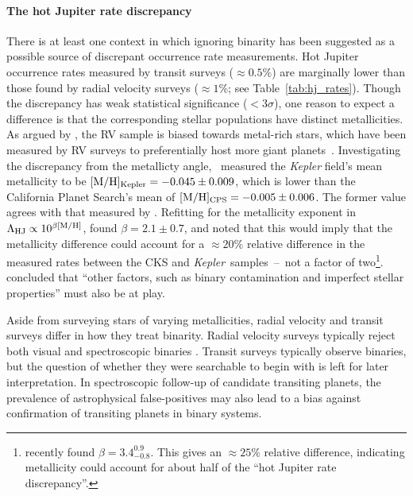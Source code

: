 \documentclass[12pt,modern]{aastex61}
\begin{document}
\paragraph{The hot Jupiter rate discrepancy}
There is at least one context in which ignoring binarity has been suggested as 
a possible source of discrepant occurrence rate measurements.
Hot Jupiter occurrence rates measured by transit surveys ($\approx 0.5\%$) are 
marginally lower than those found by radial velocity surveys ($\approx 1\%$; 
see Table~\ref{tab:hj_rates}).
Though the discrepancy has weak statistical significance ($<3\sigma$),
one reason to expect a difference is that the corresponding stellar 
populations have distinct metallicities.
As argued by \citet{gould_frequency_2006}, the RV sample is biased towards 
metal-rich stars, which have been measured by RV surveys to preferentially 
host more giant 
planets~\citep{santos_spectroscopic_2004,fischer_planet-metallicity_2005}.
Investigating the discrepancy from the metallicty 
angle,~\citet{guo_metallicity_2017} measured the
{\it Kepler} field's mean metallicity to be $[{\rm M/H}]_{\rm Kepler}= 
-0.045\pm0.009$, which is lower than the California Planet Search's mean of 
$[{\rm M/H}]_{\rm CPS}= -0.005\pm0.006$.
The former value agrees with that measured by \citet{dong_metallicities_2014}.
Refitting for the metallicity exponent in $\Lambda_{\rm HJ} \propto 10^{\beta 
[{\rm M/H}] }$, \citeauthor{guo_metallicity_2017}\! found $\beta = 2.1\pm 
0.7$, and noted that this would imply that the metallicity difference could 
account for a $\approx 20\%$ relative difference in the measured rates between 
the CKS and {\it Kepler}\ samples~--~not a factor of two\footnote{
\citet{petigura_CKS_2017} recently found $\beta = 3.4^{0.9}_{-0.8}$.
This gives an $\approx 25\%$ relative difference, indicating metallicity could 
account for about half of the ``hot Jupiter rate discrepancy''.
}.
\citeauthor{guo_metallicity_2017}\! concluded that ``other factors, such as 
binary contamination and imperfect stellar properties'' must also be at play.

Aside from surveying stars of varying metallicities, radial velocity and 
transit surveys differ in how they treat binarity.
Radial velocity surveys typically reject both visual and spectroscopic binaries
\citep[\textit{e.g.},][]{wright_frequency_2012}.
Transit surveys typically observe binaries, but the question of whether they 
were searchable to begin with is left for later interpretation.
In spectroscopic follow-up of candidate transiting planets, the prevalence of 
astrophysical false-positives may also lead to a bias against confirmation of 
transiting planets in binary systems.
\end{document}
